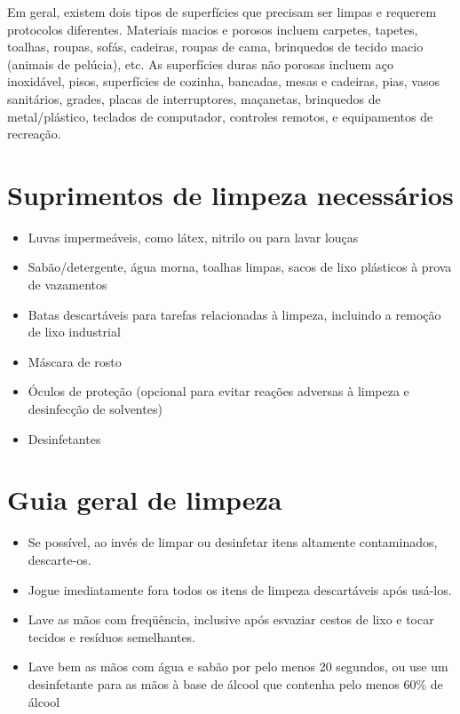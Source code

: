 \documentclass[onecolumn,journal]{IEEEtran}
\begin{document}
\begin{multicols}{2}
Em geral, existem dois tipos de superfícies que precisam ser limpas e requerem protocolos diferentes. Materiais macios e porosos incluem carpetes, tapetes, toalhas, roupas, sofás, cadeiras, roupas de cama, brinquedos de tecido macio (animais de pelúcia), etc. As superfícies duras não porosas incluem aço inoxidável, pisos, superfícies de cozinha, bancadas, mesas e cadeiras, pias, vasos sanitários, grades, placas de interruptores, maçanetas, brinquedos de metal/plástico, teclados de computador, controles remotos, e equipamentos de recreação.

\section*{Suprimentos de limpeza necessários}

\begin{itemize}
    \item Luvas impermeáveis, como látex, nitrilo ou para lavar louças
    \item Sabão/detergente, água morna, toalhas limpas, sacos de lixo plásticos à prova de vazamentos
    \item Batas descartáveis para tarefas relacionadas à limpeza, incluindo a remoção de lixo industrial
    \item Máscara de rosto
    \item Óculos de proteção (opcional para evitar reações adversas à limpeza e desinfecção de solventes)
    \item Desinfetantes
\end{itemize}

\section*{Guia geral de limpeza}

\begin{itemize}
    \item Se possível, ao invés de limpar ou desinfetar itens altamente contaminados, descarte-os.
    \item Jogue imediatamente fora todos os itens de limpeza descartáveis após usá-los.
    \item Lave as mãos com freqüência, inclusive após esvaziar cestos de lixo e tocar tecidos e resíduos semelhantes.
    \item Lave bem as mãos com água e sabão por pelo menos 20 segundos, ou use um desinfetante para as mãos à base de álcool que contenha pelo menos 60\% de álcool
\end{itemize}


\end{multicols}
\end{document}
